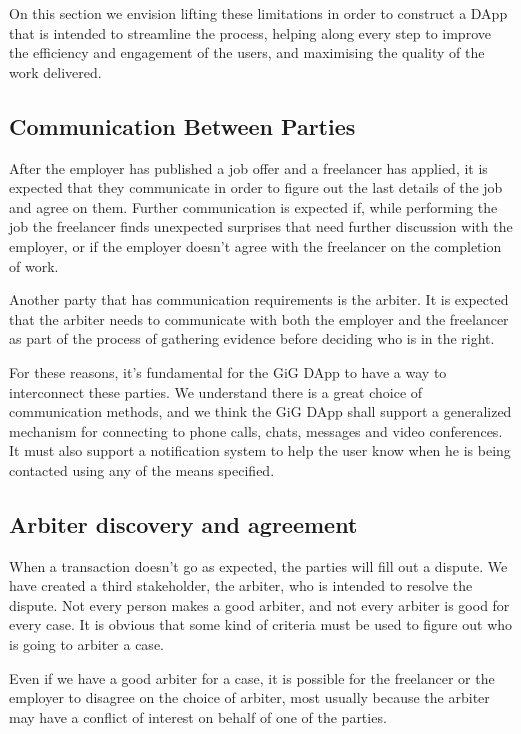 \documentclass{article}
\begin{document}
On this section we envision lifting these limitations in order to construct a DApp that is intended to streamline the process, helping along every step to improve the efficiency and engagement of the users, and maximising the quality of the work delivered.

\subsection{Communication Between Parties}

After the employer has published a job offer and a freelancer has applied, it is expected that they communicate in order to figure out the last details of the job and agree on them. Further communication is expected if, while performing the job the freelancer finds unexpected surprises that need further discussion with the employer, or if the employer doesn't agree with the freelancer on the completion of work.

Another party that has communication requirements is the arbiter. It is expected that the arbiter needs to communicate with both the employer and the freelancer as part of the process of gathering evidence before deciding who is in the right.

For these reasons, it's fundamental for the GiG DApp to have a way to interconnect these parties. We understand there is a great choice of communication methods, and we think the GiG DApp shall support a generalized mechanism for connecting to phone calls, chats, messages and video conferences. It must also support a notification system to help the user know when he is being contacted using any of the means specified.

\subsection{Arbiter discovery and agreement}

When a transaction doesn't go as expected, the parties will fill out a dispute. We have created a third stakeholder, the arbiter, who is intended to resolve the dispute. Not every person makes a good arbiter, and not every arbiter is good for every case. It is obvious that some kind of criteria must be used to figure out who is going to arbiter a case.

Even if we have a good arbiter for a case, it is possible for the freelancer or the employer to disagree on the choice of arbiter, most usually because the arbiter may have a conflict of interest on behalf of one of the parties.
\end{document}
